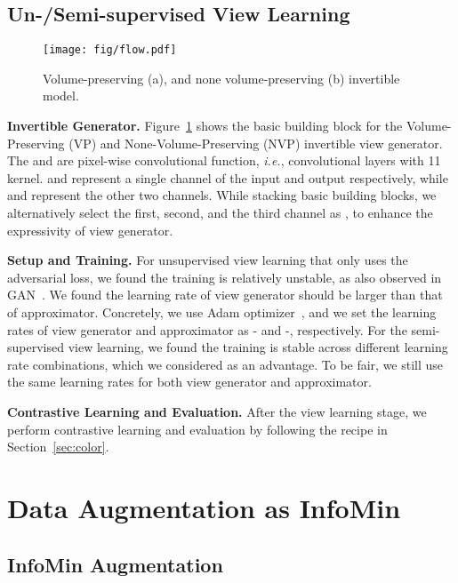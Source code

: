 \documentclass{article}
\begin{document}
\subsection{Un-/Semi-supervised View Learning}
\begin{figure}[h]
\centering
\vspace{-10pt}
\texttt{[image: fig/flow.pdf]}
\caption{Volume-preserving (a), and none volume-preserving (b) invertible model.}
\vspace{-5pt}
\label{fig:flow}
\end{figure}
 \noindent\textbf{Invertible Generator.} Figure~\ref{fig:flow} shows the basic building block for the Volume-Preserving (VP) and None-Volume-Preserving (NVP) invertible view generator. The  and  are pixel-wise convolutional function, \emph{i.e.}, convolutional layers with 11 kernel.  and  represent a single channel of the input and output respectively, while  and  represent the other two channels. While stacking basic building blocks, we alternatively select the first, second, and the third channel as , to enhance the expressivity of view generator.

\noindent\textbf{Setup and Training.} For unsupervised view learning that only uses the adversarial  loss, we found the training is relatively unstable, as also observed in GAN~\cite{goodfellow2014generative}. We found the learning rate of view generator should be larger than that of  approximator. Concretely, we use Adam optimizer~\cite{kingma2014adam}, and we set the learning rates of view generator and  approximator as - and -, respectively. For the semi-supervised view learning, we found the training is stable across different learning rate combinations, which we considered as an advantage. To be fair, we still use the same learning rates for both view generator and  approximator. 

\noindent\textbf{Contrastive Learning and Evaluation.} After the view learning stage, we perform contrastive learning and evaluation by following the recipe in Section~\ref{sec:color}. \section{Data Augmentation as InfoMin}




\subsection{InfoMin Augmentation}
\end{document}
